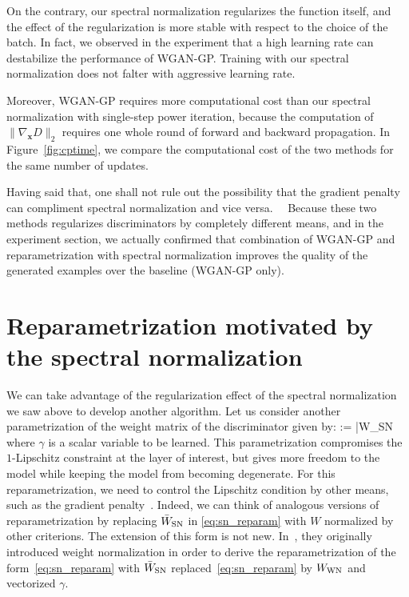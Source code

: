 \documentclass{article}
\newcommand{\bmx}{{\bm x}}
\newenvironment{important}[2][]{
	\setkeys{EmphEqEnv}{#2}
	\setkeys{EmphEqOpt}{box={\setlength{\fboxsep}{10pt}\colorbox{medGray}},#1}
	\EmphEqMainEnv}
{\endEmphEqMainEnv}
\begin{document}
On the contrary, our spectral normalization regularizes the function itself, and the effect of the regularization is more stable with respect to the choice of the batch.
In fact, we observed in the experiment that a high learning rate can destabilize the performance of WGAN-GP. Training with our spectral normalization does not falter with aggressive learning rate.

Moreover, WGAN-GP requires more computational cost than our spectral normalization with single-step power iteration, because the computation of  $\|\nabla_{\bmx}D\|_2$ requires one whole round of forward and backward propagation.
In Figure~\ref{fig:cptime}, we compare the computational cost of the two methods for the same number of updates.

Having said that, one shall not rule out the possibility that the  gradient penalty can compliment spectral normalization and vice versa.　
Because these two methods regularizes discriminators by completely different means, and in the experiment section, we actually confirmed that combination of WGAN-GP and reparametrization with spectral normalization improves the quality of the generated examples over the baseline (WGAN-GP only).

\section{Reparametrization motivated by the spectral normalization}
\label{subsec:reparametrization}
We can take advantage of the regularization effect of the spectral normalization we saw above to develop another algorithm.
Let us consider another parametrization of the weight matrix of the discriminator given by:
\begin{important}{equation}
	:= \gamma \bar{W}_{\rm SN} \label{eq:sn_reparam}
\end{important}
where $\gamma$ is a scalar variable to be learned.
This parametrization compromises the $1$-Lipschitz constraint at the layer of interest, but gives more freedom to the model while keeping the model from becoming degenerate.
For this reparametrization,  we need to control the Lipschitz condition by other means, such as the gradient penalty~\cite[]{gulrajani2017improved}.
Indeed, we can think of analogous versions of reparametrization by replacing $\bar{W}_{\rm SN}$ in \eqref{eq:sn_reparam} with $W$ normalized by other criterions.
The extension of this form is not new. In~\cite{salimans2016weight}, they originally introduced weight normalization in order to derive the reparametrization of the form~\eqref{eq:sn_reparam} with $\bar W_{\rm SN}$ replaced~\eqref{eq:sn_reparam} by $W_{\rm WN}$ and vectorized $\gamma$.
\end{document}
